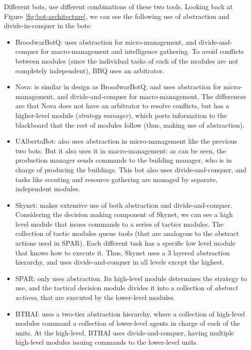 \documentclass[journal]{IEEEtran}
\begin{document}
Different bots, use different combinations of these two tools. Looking back at Figure \ref{fig:bot-architecture}, we can see the following use of abstraction and divide-in-conquer in the bots:

\begin{itemize}
\item BroodwarBotQ: uses abstraction for micro-management, and divide-and-conquer for macro-management and intelligence gathering. To avoid conflicts between modules (since the individual tasks of each of the modules are not completely independent), BBQ uses an arbitrator.
\item Nova: is similar in design as BroodwarBotQ, and uses abstraction for micro-management, and divide-and-conquer for macro-management. The differences are that Nova does not have an arbitrator to resolve conflicts, but has a higher-level module ({\em strategy manager}), which posts information to the blackboard that the rest of modules follow (thus, making use of abstraction).
\item UAlbertaBot: also uses abstraction in micro-management like the previous two bots. But it also uses it in macro-management: as can be seen, the production manager sends commands to the building manager, who is in charge of producing the buildings. This bot also uses divide-and-conquer, and tasks like scouting and resource gathering are managed by separate, independent modules.
\item Skynet: makes extensive use of both abstraction and divide-and-conquer. Considering the decision making component of Skynet, we can see a high level module that issues commands to a series of tactics modules. The collection of tactic modules queue {\em tasks} (that are analogous to the abstract actions used in SPAR). Each different task has a specific low level module that knows how to execute it. Thus, Skynet uses a 3 layered abstraction hierarchy, and uses divide-and-conquer in all levels except the highest.
\item SPAR: only uses abstraction. Its high-level module determines the strategy to use, and the tactical decision module divides it into a collection of {\em abstract actions}, that are executed by the lower-level modules.
\item BTHAI: uses a two-tier abstraction hierarchy, where a collection of high-level modules command a collection of lower-level agents in charge of each of the units. At the high-level, BTHAI uses divide-and-conquer, having multiple high-level modules issuing commands to the lower-level units.
\end{itemize}
\end{document}
